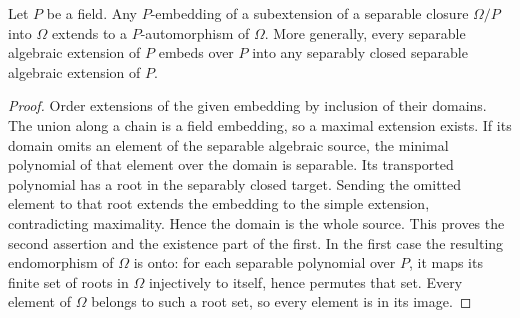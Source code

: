 \begin{lemma}
\label{fw:separable-embedding-extension}
\leanok
Let $P$ be a field. Any $P$-embedding of a subextension of a separable
closure $\Omega/P$ into $\Omega$ extends to a $P$-automorphism of
$\Omega$. More generally, every separable algebraic extension of $P$
embeds over $P$ into any separably closed separable algebraic extension
of $P$.
\end{lemma}
\begin{proof}
Order extensions of the given embedding by inclusion of their domains.
The union along a chain is a field embedding, so a maximal extension
exists. If its domain omits an element of the separable algebraic
source, the minimal polynomial of that element over the domain is
separable. Its transported polynomial has a root in the separably
closed target. Sending the omitted element to that root extends the
embedding to the simple extension, contradicting maximality. Hence
the domain is the whole source. This proves the second assertion and
the existence part of the first. In the first case the resulting
endomorphism of $\Omega$ is onto: for each separable polynomial over
$P$, it maps its finite set of roots in $\Omega$ injectively to itself,
hence permutes that set. Every element of $\Omega$ belongs to such a
root set, so every element is in its image.
\end{proof}

